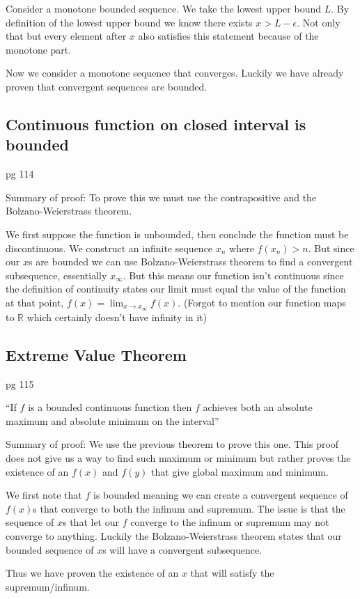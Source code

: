 \documentclass{article}
\begin{document}
Consider a monotone bounded sequence.
We take the lowest upper bound $L$. By definition of the lowest upper bound
we know there exists $x > L - \epsilon$. Not only that but every element after
$x$ also satisfies this statement because of the monotone part.

Now we consider a monotone sequence that converges. Luckily we have already
proven that convergent sequences are bounded.

\subsection{Continuous function on closed interval is bounded}
pg 114

Summary of proof: To prove this we must use the contrapositive and the
Bolzano-Weierstrass theorem.

We first suppose the function is unbounded,
then conclude the function must be discontinuous.
We construct an infinite sequence $x_n$ where $f(x_n) > n$. But since our
$x$s are bounded we can use Bolzano-Weierstrass theorem to find a convergent
subsequence, essentially $x_\infty$. But this means our function isn't
continuous since the definition of continuity states our limit must equal the
value of the function at that point, $f(x) = \lim_{x \to x_\infty} f(x)$.
(Forgot to mention our function maps to $\mathbb{R}$ which certainly doesn't
have infinity in it)

\subsection{Extreme Value Theorem}
pg 115

``If $f$ is a bounded continuous function then $f$ achieves both an absolute
maximum and absolute minimum on the interval''

Summary of proof: We use the previous theorem to prove this one. This proof
does not give us a way to find such maximum or minimum but rather proves
the existence of an $f(x)$ and $f(y)$ that give global maximum and minimum.

We first note that $f$ is bounded meaning we can create a convergent sequence
of $f(x)$s that converge to both the infinum and supremum. The issue is that
the sequence of $x$s that let our $f$ converge to the infinum or supremum
may not converge to anything. Luckily the Bolzano-Weierstrass theorem states
that our bounded sequence of $x$s will have a convergent subsequence.

Thus we have proven the existence of an $x$ that will satisfy the
supremum/infinum.
\end{document}
